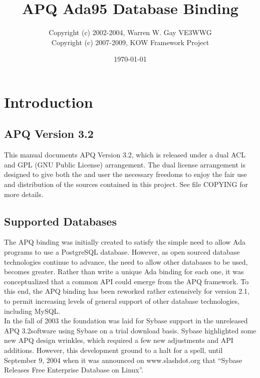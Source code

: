 \documentclass[english,letterpaper]{book}
\newcommand\apqversion{3.2}
\begin{document}
\title{APQ Ada95 Database Binding}
\author{%
Copyright (c) 2002-2004, Warren W. Gay VE3WWG\\%
Copyright (c) 2007-2009, KOW Framework Project
}
\date{\today}
\maketitle

\tableofcontents{}
\listoftables

\chapter{Introduction}


\section{APQ Version \apqversion}

This manual documents APQ Version \apqversion, which is released under a dual
ACL and GPL (GNU Public License) arrangement. The dual license arrangement is designed to give
both the  and user the necessary freedoms to enjoy
the fair use and distribution of the sources  contained in this project. See file COPYING for
more details.


\section{Supported Databases}

The APQ binding was initially created to satisfy the simple need to
allow Ada programs to use a PostgreSQL database. However, as open
sourced database technologies continue to advance, the need to allow
other databases to be used, becomes greater. Rather than write a unique
Ada binding for each one, it was conceptualized that a common API
could emerge from the APQ framework. To this end, the APQ binding
has been reworked rather extensively for version 2.1, to permit increasing
levels of general support of other database technologies, including
MySQL.\\

In the fall of 2003 the foundation was laid for Sybase support in
the unreleased APQ \apqversion software using Sybase on a trial download basis.
Sybase highlighted some new APQ design  wrinkles, which required a
few new adjustments and API additions. However, this development ground
to a halt for a spell, until September 9, 2004 when it was announced
on www.slashdot.org that ``Sybase Releases Free Enterprise Database
on Linux''.\\
\end{document}
